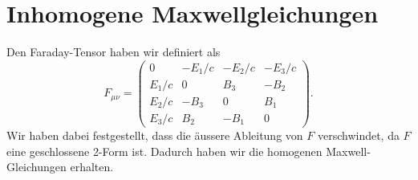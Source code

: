 %
%
%
%
\section{Inhomogene Maxwellgleichungen
	\label{maxwell:section:InhomogeneMaxwellgleichungen}}
Den Faraday-Tensor haben wir definiert als
\begin{equation*}
	F_{\mu \nu} = \begin{pmatrix}
		0 & -E_1/c & -E_2/c & -E_3/c \\ E_1/c & 0 & B_3 & -B_2 \\ E_2/c & -B_3 & 0 & B_1 \\ E_3/c & B_2 & -B_1 & 0 
	\end{pmatrix}.
\end{equation*}
Wir haben dabei festgestellt, dass die äussere Ableitung von $F$ verschwindet, da $F$ eine geschlossene 2-Form ist. Dadurch haben wir die homogenen Maxwell-Gleichungen erhalten. 

